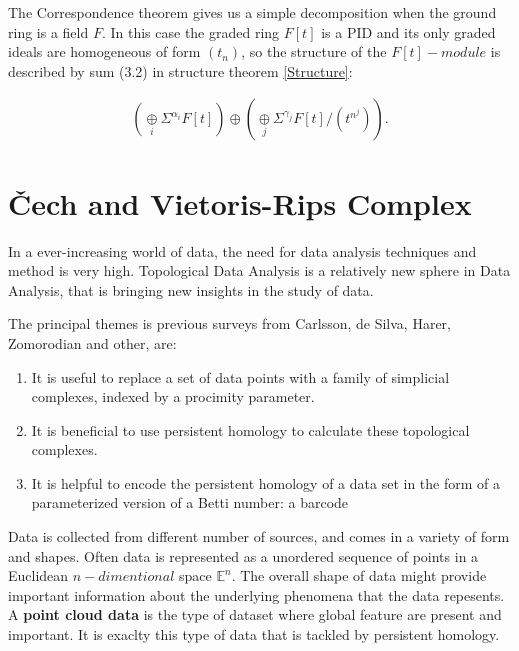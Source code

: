\documentclass[11pt,a4paper]{report}
\begin{document}
            The Correspondence theorem gives us a simple decomposition when the ground ring is a field $F$. In this case the graded ring $F[t]$ is a PID and its only graded ideals are homogeneous of form $(t_n)$, so the structure of the $F[t]-module$ is described by sum (3.2) in structure theorem \ref{Structure}:

            \begin{align}
                (\underset{i}{\oplus} \Sigma^{\alpha_i} F[t]) \oplus (\underset{j}{\oplus} \Sigma ^{\gamma_j} F[t]/(t^{n^j})).
              \end{align}
              
              
              
              \section{\v{C}ech and Vietoris-Rips Complex}
              \label{CechRips}
              
              In a ever-increasing world of data, the need for data analysis techniques and method is very high. 
              Topological Data Analysis is a relatively new sphere in Data Analysis, that is bringing new insights in the study of data. 
              
              The principal themes is previous surveys from Carlsson, de Silva, Harer, Zomorodian and other, are:
              \begin{enumerate}
               \item It is useful to replace a set of data points with a family of simplicial complexes, indexed by a 
               procimity parameter. 
               \item It is beneficial to use persistent homology to calculate these topological complexes.
               \item It is helpful to encode the persistent homology of a data set in the form
of a parameterized version of a Betti number: a barcode
              \end{enumerate}
              
              Data is collected from different number of sources, and comes in a variety of form and shapes. Often data is represented as a unordered sequence of points in a Euclidean $n-dimentional$ space $\mathbb{E}^n$. The overall shape of data might provide important information about the underlying phenomena that
              the data repesents. A \textbf{point cloud data} is the type of dataset where global feature are present and important. It is exaclty this type of data that is tackled by persistent homology.
              
\end{document}
